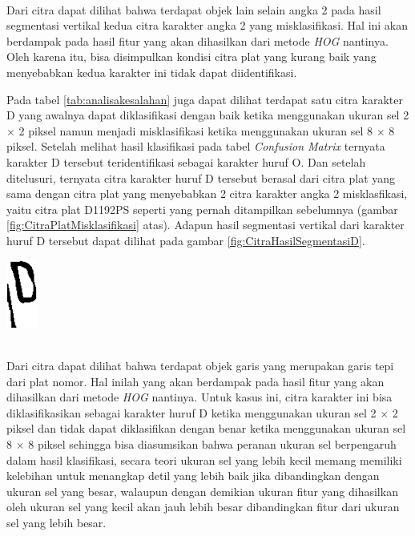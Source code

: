 \\
\noindent Dari citra dapat dilihat bahwa terdapat objek lain selain angka 2 pada hasil segmentasi vertikal kedua citra karakter angka 2 yang misklasifikasi. Hal ini akan berdampak pada hasil fitur yang akan dihasilkan dari metode \textit{HOG} nantinya. Oleh karena itu, bisa disimpulkan kondisi citra plat yang kurang baik yang menyebabkan kedua karakter ini tidak dapat diidentifikasi.

\noindent Pada tabel \ref{tab:analisakesalahan} juga dapat dilihat terdapat satu citra karakter D yang awalnya dapat diklasifikasi dengan baik ketika menggunakan ukuran sel 2 $\times$ 2 piksel namun menjadi misklasifikasi ketika menggunakan ukuran sel 8 $\times$ 8 piksel. Setelah melihat hasil klasifikasi pada tabel \textit{Confusion Matrix} ternyata karakter D tersebut teridentifikasi sebagai karakter huruf O. Dan setelah ditelusuri, ternyata citra karakter huruf D tersebut berasal dari citra plat yang sama dengan citra plat yang menyebabkan 2 citra karakter angka 2 misklasfikasi, yaitu citra plat D1192PS seperti yang pernah ditampilkan sebelumnya (gambar \ref{fig:CitraPlatMisklasifikasi} atas). Adapun hasil segmentasi vertikal dari karakter huruf D tersebut dapat dilihat pada gambar \ref{fig:CitraHasilSegmentasiD}.

\begin{adjustbox}{width=1\textwidth}
	\noindent\begin{minipage}{\linewidth}
		\centering\includegraphics[width=1cm]{images/DMisklasifikasi.png}
		\label{fig:CitraHasilSegmentasiD}
	\end{minipage}
\end{adjustbox}\\

\noindent Dari citra dapat dilihat bahwa terdapat objek garis yang merupakan garis tepi dari plat nomor. Hal inilah yang akan berdampak pada hasil fitur yang akan dihasilkan dari metode \textit{HOG} nantinya. Untuk kasus ini, citra karakter ini bisa diklasifikasikan sebagai karakter huruf D ketika menggunakan ukuran sel 2 $\times$ 2 piksel dan tidak dapat diklasifikan dengan benar ketika menggunakan ukuran sel 8 $\times$ 8 piksel sehingga bisa diasumsikan bahwa peranan ukuran sel berpengaruh dalam hasil klasifikasi, secara teori ukuran sel yang lebih kecil memang memiliki kelebihan untuk menangkap detil yang lebih baik jika dibandingkan dengan ukuran sel yang besar, walaupun dengan demikian ukuran fitur yang dihasilkan oleh ukuran sel yang kecil akan jauh lebih besar dibandingkan fitur dari ukuran sel yang lebih besar.

